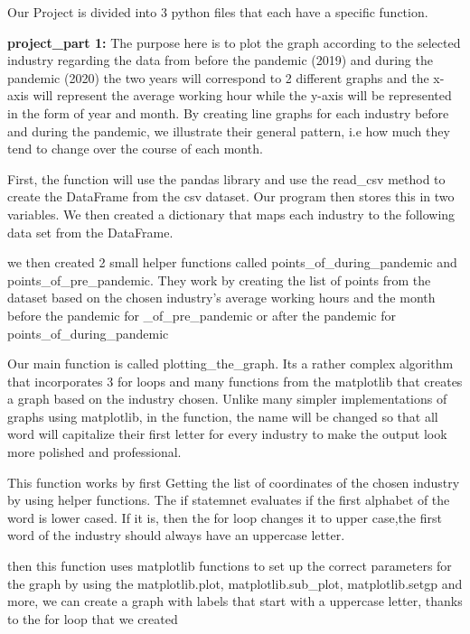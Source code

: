 \documentclass[fontsize=11pt]{article}
\begin{document}
Our Project is divided into 3 python files that each have a specific function.

\medskip   

\textbf{project\_part 1:} The purpose here is to plot the graph according to the selected industry regarding the data from before the pandemic (2019) and during the pandemic (2020) the two years will correspond to 2 different graphs and the x-axis will represent the average working hour while the y-axis
will be represented in the form of year and month. By creating line graphs for each industry before and during the pandemic, we illustrate their general pattern, i.e how much they tend to change over the course of each month. 

\medskip 


First, the function will use the pandas library and use the read\_csv method to create the DataFrame from the csv dataset. Our program then stores this in
two variables.
We then created a dictionary that maps each industry to the following data set from the DataFrame.


we then created 2 small helper functions called points\_of\_during\_pandemic
and points\_of\_pre\_pandemic. They work by creating the list of points from the dataset based on the chosen industry's average working hours and the month before the pandemic for \_of\_pre\_pandemic or after the pandemic for points\_of\_during\_pandemic

Our main function is called plotting\_the\_graph. Its a rather complex algorithm that incorporates 3 for loops and many functions from the matplotlib that creates a graph based on the industry chosen. Unlike many simpler implementations of graphs using matplotlib, in the function, the name will be changed so that all word will capitalize their first letter for every industry to make the output look more polished and professional.

This function works by first Getting the list of coordinates of the chosen industry by using helper functions. The if statemnet evaluates if the first alphabet of the word is lower cased. If it is, then the for loop changes it to upper case,the first word of the industry should always have an uppercase letter.


then this function uses matplotlib functions to set up the correct parameters for the graph by using the matplotlib.plot, matplotlib.sub\_plot, matplotlib.setgp and more, we can create a graph with labels that start with a uppercase letter, thanks to the for loop that we created
\end{document}
